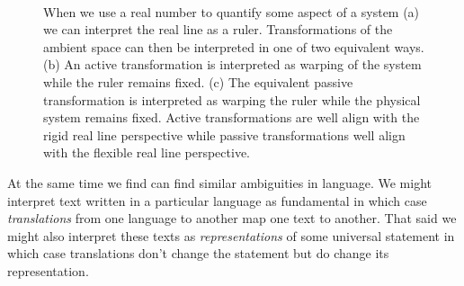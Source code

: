\documentclass[
  letterpaper,
  DIV=11,
  numbers=noendperiod]{scrartcl}
\begin{document}
\begin{figure}
\begin{minipage}[t]{0.30\linewidth}
{{}

}

\subcaption{\label{fig-transformed_system}}
\end{minipage}%
%
\begin{minipage}[t]{0.30\linewidth}

{\centering 


}

\subcaption{\label{fig-transformed_ruler}}
\end{minipage}%
%
\begin{minipage}[t]{0.05\linewidth}

{\centering 

~

}

\end{minipage}%

\caption{\label{fig-ruler}When we use a real number to quantify some
aspect of a system (a) we can interpret the real line as a ruler.
Transformations of the ambient space can then be interpreted in one of
two equivalent ways. (b) An active transformation is interpreted as
warping of the system while the ruler remains fixed. (c) The equivalent
passive transformation is interpreted as warping the ruler while the
physical system remains fixed. Active transformations are well align
with the rigid real line perspective while passive transformations well
align with the flexible real line perspective.}

\end{figure}

At the same time we find can find similar ambiguities in language. We
might interpret text written in a particular language as fundamental in
which case \emph{translations} from one language to another map one text
to another. That said we might also interpret these texts as
\emph{representations} of some universal statement in which case
translations don't change the statement but do change its
representation.
\end{document}
